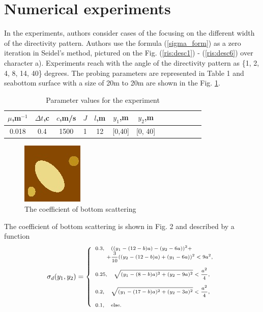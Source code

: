 \documentclass{procDDs}
\begin{document}
\section{Numerical experiments}
In the experiments, authors consider cases of the focusing on the different width of the directivity pattern. Authors use the formula (\ref{sigma_form}) as a zero iteration in Seidel's method, pictured on the Fig. (\ref{ris:desc1}) - (\ref{ris:desc6}) over character a). Experiments reach with the angle of the directivity pattern as  \{1, 2, 4, 8, 14, 40\} degrees. 
The probing parameters are represented in Table 1 and seabottom surface with a size of 20m to 20m are shown in the Fig. \ref{ris:dno}.
\begin{table}[!ht]
	\begin{tabular}{|c|c|c|c|c|c|c|c|c|c|c|c|c|}
		\hline
		$\mu$,m$^{-1}$ & $\Delta t$,c & $c$,m/s & $J$ & $l$,m & $y_1$,m & $y_2$,m\\
		\hline
		0.018 & 0.4 & 1500 & 1 & 12 & [0,40] & [0, 40]\\ \hline
	\end{tabular}
	\label{table:name}
	\caption{Parameter values for the experiment}
\end{table}
\begin{figure}[h!]\center
	\includegraphics[width=0.3\linewidth]{dno.jpg}
	\caption{The coefficient of bottom scattering }
	\label{ris:dno}
\end{figure}

The coefficient of bottom scattering is shown in Fig. 2 and described by a function 
\begin{equation}
\scriptsize
\label{sigma_d}
\sigma_d(y_1, y_2) = 
\left\{
\begin{array}{ll}
0.3 , \quad  ((y_1-(12-b)a)-(y_2-6a))^2+\\ \quad \quad +\dfrac{3}{10}((y_2-(12-b)a)+(y_1-6a))^2<9a^2,  \\ \\
0.25, \quad \sqrt{(y_1-(8-b)a)^2+(y_2-9a)^2}<\dfrac{a^2}{4}, \\ \\
0.2 ,\quad  \sqrt{(y_1-(17-b)a)^2+(y_2-3a)^2}<\dfrac{a^2}{4}, \\ \\
0.1 , \quad \hbox{else.} \\
\end{array}%
\right.
\end{equation}
\end{document}
